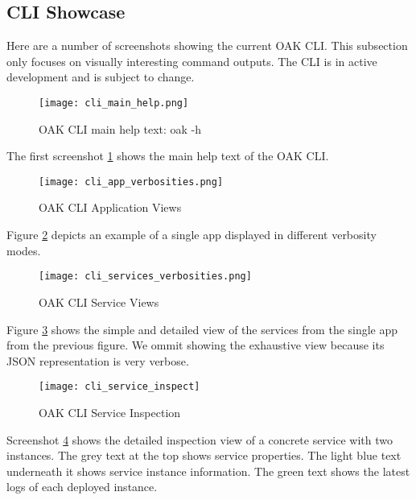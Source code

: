 \subsection{CLI Showcase}

Here are a number of screenshots showing the current OAK CLI.
This subsection only focuses on visually interesting command outputs. 
The CLI is in active development and is subject to change.

\begin{figure}[h]
    \begin{adjustwidth}{-0.1\paperwidth}{-0.1\paperwidth}
        \centering
        \texttt{[image: cli\_main\_help.png]}
        \caption{OAK CLI main help text: oak -h}
        \label{fig:cli_main_help}
    \end{adjustwidth}
\end{figure}
The first screenshot \ref{fig:cli_main_help} shows the main help text of the OAK CLI.

\begin{figure}[h]
    \begin{adjustwidth}{-0.2\paperwidth}{-0.2\paperwidth}
        \centering
        \texttt{[image: cli\_app\_verbosities.png]}
        \caption{OAK CLI Application Views}
        \label{fig:cli_app_views}
    \end{adjustwidth}
\end{figure}
Figure \ref{fig:cli_app_views} depicts an example of a single app displayed in different verbosity modes.

\begin{figure}[h]
        \centering
        \texttt{[image: cli\_services\_verbosities.png]}
        \caption{OAK CLI Service Views}
        \label{fig:cli_service_views}
\end{figure}
Figure \ref{fig:cli_service_views} shows the simple and detailed view of the services from the single app from the previous figure.
We ommit showing the exhaustive view because its JSON representation is very verbose.

\begin{figure}[p]
    \begin{adjustwidth}{-0.1\paperwidth}{-0.1\paperwidth}
        \centering
        \texttt{[image: cli\_service\_inspect]}
        \caption{OAK CLI Service Inspection}
        \label{fig:cli_service_inspection}
    \end{adjustwidth}
\end{figure}
Screenshot \ref{fig:cli_service_inspection} shows the detailed inspection view of a concrete service with two instances.
The grey text at the top shows service properties.
The light blue text underneath it shows service instance information.
The green text shows the latest logs of each deployed instance.
